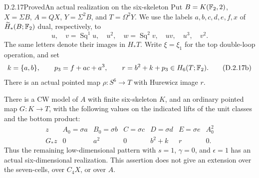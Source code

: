 \begin{claim}{D.2.17}{Proved}{An actual realization on the six-skeleton}
Put $B=K(\mathbb F_2,2)$, $X=\Sigma B$, $A=QX$, $Y=\Sigma^2B$, and
$T=\Omega^2Y$. We use the labels $a,b,c,d,e,f,x$ of
$\widetilde H_*(B;\mathbb F_2)$ dual, respectively, to
\[
 u,\quad v=\operatorname{Sq}^1u,\quad u^2,\quad
 w=\operatorname{Sq}^2v,\quad uv,\quad u^3,\quad v^2.
 \tag{D.2.17a}
\]
The same letters denote their images in $H_*T$. Write
$\xi=\xi_1$ for the top double-loop operation, and set
\[
 k=\{a,b\},\qquad p_3=f+ac+a^3,\qquad
 r=b^2+k+p_3\in H_6(T;\mathbb F_2).
 \tag{D.2.17b}
\]
There is an actual pointed map $\rho:S^6\to T$ with Hurewicz
image $r$.

There is a CW model of $A$ with finite six-skeleton $K$, and an
ordinary pointed map $G:K\to T$, with the following values on
the indicated lifts of the unit classes and the bottom product:
\[
\begin{array}{c|rrrrrr}
 z&A_0=\sigma a&B_0=\sigma b&C=\sigma c&D=\sigma d&E=\sigma e&A_0^2\\
 \hline
 G_*z&0&a^2&0&b^2+k&r&0.
\end{array}
 \tag{D.2.17c}
\]
Thus the remaining low-dimensional pattern with $s=1$, $\gamma=0$,
and $\epsilon=1$ has an actual six-dimensional realization.
This assertion does not give an extension over the seven-cells,
over $C_4X$, or over $A$.
\end{claim}
